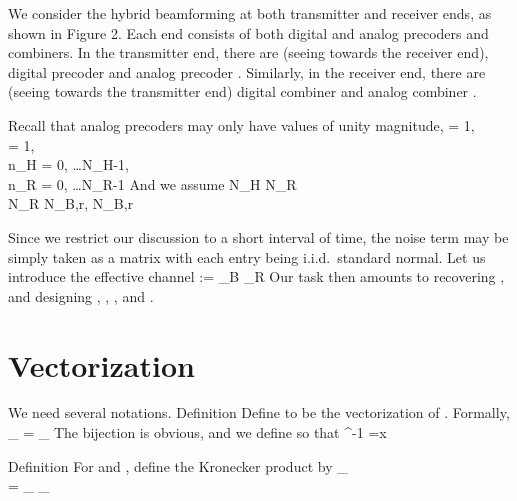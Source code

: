 We consider the hybrid beamforming at both transmitter and receiver ends, as shown in Figure 2.
Each end consists of both digital and analog precoders and combiners.
In the transmitter end, there are (seeing towards the receiver end), digital precoder  and analog precoder .
Similarly, in the receiver end, there are (seeing towards the transmitter end) digital combiner  and analog combiner .

Recall that analog precoders may only have values of unity magnitude,
%
 {
= 1, \\
%
= 1, \\
%
n_H
= 0, \dots N_H-1, \\
%
n_R
= 0, \dots N_R-1 
}
%
And we assume
%
 {
N_H \gg N_R \\
%
N_R \gg N_{B,r}, N_{B,r}
}

Since we restrict our discussion to a short interval of time, the noise term may be simply taken as a matrix  with each entry being i.i.d.\ standard normal.
Let us introduce the effective channel
%
 {
:= _B  _R  
}
%
Our task then amounts to recovering , and designing , , , and .


\section {Vectorization}

We need several notations.
%
\Result
{Definition}
{
Define  to be the vectorization of .
Formally,
%
 {
 _{}
= _{} 
}
%
The bijection is obvious, and we define  so that
%
 {
 ^{-1} 
=x 
}
}

\Result
{Definition}
{
For  and , define the Kronecker product  by
%
 {
 _{} \\
%
= _{}
 _{} 
}
}

